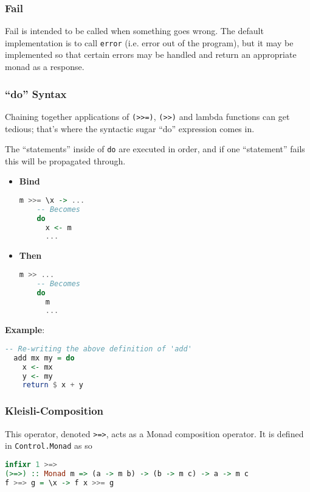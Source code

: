 \subsubsection{Fail}

Fail is intended to be called when something goes wrong. The default implementation is to call \texttt{error} (i.e. error out of the program), but it may be implemented so that certain errors may be handled and return an appropriate monad as a response.

\subsubsection{``do'' Syntax}

Chaining together applications of \texttt{(>>=)}, \texttt{(>>)} and lambda functions can get tedious; that's where the syntactic sugar ``do'' expression comes in.

The ``statements'' inside of \texttt{do} are executed in order, and if one ``statement'' fails this will be propagated through.

\begin{itemize}
  \item \textbf{Bind} \begin{lstlisting}[language=haskell]
    m >>= \x -> ...
    -- Becomes
    do
      x <- m
      ...
  \end{lstlisting}
  \item \textbf{Then} \begin{lstlisting}[language=haskell]
    m >> ...
    -- Becomes
    do
      m
      ...
  \end{lstlisting}
\end{itemize}

\textbf{Example}:
\begin{lstlisting}[language=haskell]
  -- Re-writing the above definition of 'add'
  add mx my = do
    x <- mx
    y <- my
    return $ x + y
\end{lstlisting}

\subsubsection{Kleisli-Composition}
This operator, denoted \texttt{>=>}, acts as a Monad composition operator. It is defined in \texttt{Control.Monad} as so
\begin{lstlisting}[language=haskell]
infixr 1 >=>
(>=>) :: Monad m => (a -> m b) -> (b -> m c) -> a -> m c
f >=> g = \x -> f x >>= g
\end{lstlisting}
